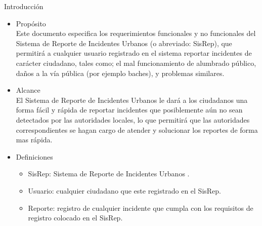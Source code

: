 {\Large \color{Naranja}Introducción}


\begin{itemize}[label=\textcolor{Lotus}{$\triangleright$}]
    \item {\large \color{Purpura}Propósito}
    \\
    Este documento especifica los requerimientos funcionales y no funcionales del Sistema de Reporte de Incidentes Urbanos (o abreviado: SisRep), que permitirá a cualquier usuario registrado en el sistema reportar incidentes de carácter ciudadano, tales como; el mal funcionamiento de alumbrado público, daños a la vía pública (por ejemplo baches), y problemas similares.
    \item {\large \color{Purpura} Alcance}
    \\
    El Sistema de Reporte de Incidentes Urbanos le dará a los ciudadanos una forma fácil y rápida de reportar incidentes que posiblemente aún no sean detectados por las autoridades locales, lo que permitirá que las autoridades correspondientes se hagan cargo de atender y solucionar los reportes de forma mas rápida.  
    \item  {\large \color{Purpura} Definiciones}
    \begin{itemize}[label=\textcolor{Amarillo}{$\triangleright$}]
        \item SisRep: Sistema de Reporte de Incidentes Urbanos .
        \item Usuario: cualquier ciudadano que este registrado en el SisRep.
        \item Reporte: registro de cualquier incidente que cumpla con los requisitos de registro colocado en el SisRep.
    \end{itemize}
\end{itemize}


